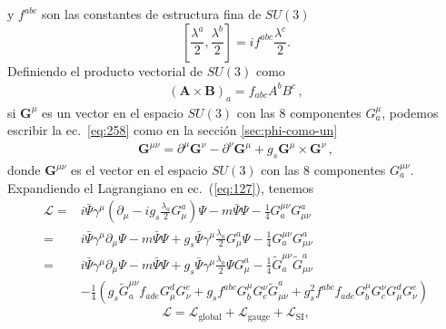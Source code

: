 y $f^{abc}$ son las constantes de estructura fina de $SU(3)$
\begin{equation}
  \left[\frac{\lambda^a}{2},\frac{\lambda^b}{2}\right]=if^{abc}\frac{\lambda^c}{2}.
\end{equation}
Definiendo el producto vectorial de $SU(3)$ como
\begin{align}
  \left(\mathbf{A}\times\mathbf{B}\right)_a=f_{abc}A^b B^c\,,
\end{align}
si $\mathbf{G}^\mu$ es un vector en el espacio $SU(3)$ con las 8 componentes $G^\mu_a$, podemos escribir la ec.~\eqref{eq:258} como en la secci\'on \ref{sec:phi-como-un}
\begin{align}
  \mathbf{G}^{\mu\nu}=\partial^\mu \mathbf{G}^\nu-\partial^\nu \mathbf{G}^\mu+g_s \mathbf{G}^\mu\times \mathbf{G}^\nu\,,
\end{align}
donde $\mathbf{G}^{\mu\nu}$ es el vector en el espacio $SU(3)$ con las 8 componentes $G^{\mu\nu}_a$.
Expandiendo el Lagrangiano en ec.~(\ref{eq:127}), tenemos
\begin{align}
  \mathcal{L}=&i\bar{\Psi}\gamma^\mu\left(\partial_\mu-i g_s\frac{\lambda_a}{2}G_\mu^a\right)\Psi
  -m\bar{\Psi}\Psi- \frac{1}{4}G^{\mu\nu}_a G_{\mu\nu}^a\nonumber\\
=&i\bar{\Psi}\gamma^\mu\partial_\mu\Psi-m\bar{\Psi}\Psi+g_s\bar{\Psi}\gamma^\mu\frac{\lambda_a}{2}G_\mu^a\Psi
  - \frac{1}{4}G^{\mu\nu}_a G_{\mu\nu}^a\nonumber\\
=&i\bar{\Psi}\gamma^\mu\partial_\mu\Psi-m\bar{\Psi}\Psi+g_s\bar{\Psi}\gamma^\mu\frac{\lambda_a}{2}\Psi G_\mu^a
  - \frac{1}{4}\widetilde{G}^{\mu\nu}_a \widetilde{G}_{\mu\nu}^a\nonumber\\
  &- \frac{1}{4}\left(g_s\widetilde{G}^{\mu\nu}_af_{a d e}G^d_\mu G^e_\nu
    +g_sf^{a b c}G_b^\mu G_c^\nu\widetilde{G}_{\mu\nu}^a
    +g_s^2f^{a b c}f_{a d e}G_b^\mu G_c^\nu G^d_\mu G^e_\nu\right)
\end{align}
\begin{equation}
  \mathcal{L}=\mathcal{L}_{\text{global}}+\mathcal{L}_{\text{gauge}}+\mathcal{L}_{\text{SI}},
\end{equation}

